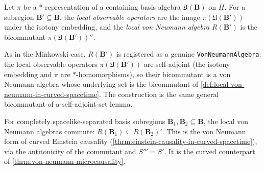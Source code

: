 \begin{definition}
    \label{def:local-von-neumann-in-curved-spacetime}
    \leanok
    Let $\pi$ be a $*$-representation of a containing basis algebra $\mathfrak{U}(\mathbf{B})$ on $H$. For a subregion $\mathbf{B}' \subseteq \mathbf{B}$, the \emph{local observable operators} are the image $\pi(\mathfrak{U}(\mathbf{B}'))$ under the isotony embedding, and the \emph{local von Neumann algebra} $R(\mathbf{B}')$ is the bicommutant $\pi(\mathfrak{U}(\mathbf{B}'))''$.
\end{definition}

\begin{definition}
    \label{def:local-von-neumann-algebra-in-curved-spacetime}
    \leanok
    As in the Minkowski case, $R(\mathbf{B}')$ is registered as a genuine \texttt{VonNeumannAlgebra}: the local observable operators $\pi(\mathfrak{U}(\mathbf{B}'))$ are self-adjoint (the isotony embedding and $\pi$ are $*$-homomorphisms), so their bicommutant is a von Neumann algebra whose underlying set is the bicommutant of \ref{def:local-von-neumann-in-curved-spacetime}. The construction is the same general bicommutant-of-a-self-adjoint-set lemma.
\end{definition}

\begin{theorem}
    \label{thrm:von-neumann-microcausality-in-curved-spacetime}
    \leanok
    For completely spacelike-separated basis subregions $\mathbf{B}_1, \mathbf{B}_2 \subseteq \mathbf{B}$, the local von Neumann algebras commute: $R(\mathbf{B}_1) \subseteq R(\mathbf{B}_2)'$. This is the von Neumann form of curved Einstein causality (\ref{thrm:einstein-causality-in-curved-spacetime}), via the antitonicity of the commutant and $S''' = S'$. It is the curved counterpart of \ref{thrm:von-neumann-microcausality}.
\end{theorem}

